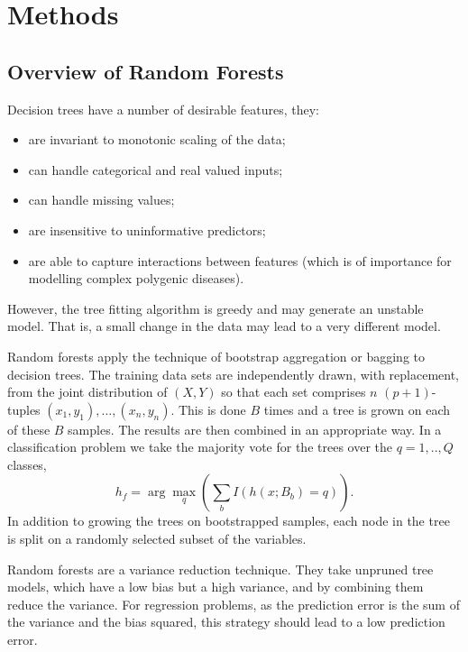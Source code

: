 \documentclass[10pt,letterpaper]{article}
\begin{document}
\section{Methods}
\label{section:methods}

\subsection{Overview of Random Forests}

Decision trees have a number of desirable features, they:
\begin{itemize}
  \item are invariant to monotonic scaling of the data;
  \item can handle categorical and real valued inputs;
  \item can handle missing values;
  \item are insensitive to uninformative predictors;
  \item are able to capture interactions between features (which is of importance for modelling complex polygenic diseases).
  \end{itemize}
However, the tree fitting algorithm is greedy and may generate an unstable model. That is, a small change in the data may
lead to a very different model. 

Random forests apply the technique of bootstrap aggregation or bagging to decision trees.  The training data sets are
independently drawn, with replacement, from the joint distribution of $(X,Y)$ so that each set comprises $n$
$(p+1)$-tuples $(x_1,y_1),\ldots, (x_n,y_n)$. This is done $B$ times and a tree is grown on each of these $B$ samples.
The results are then combined in an appropriate way. In a classification problem we take the majority vote for the trees
over the $q=1,..,Q$ classes,
\begin{equation*}
{{h_f}}= \arg \max_q \left(\sum_b I(h(x;B_b)=q)\right).
\end{equation*}
In addition to growing the trees
on bootstrapped samples, each node in the tree is split on a randomly
selected subset of the variables.

Random forests are a variance reduction technique. They take unpruned tree models, which have a low bias but a high
variance, and by combining them reduce the variance.  For regression problems, as the prediction error is the sum of the
variance and the bias squared, this strategy should lead to a low prediction error.
\end{document}
